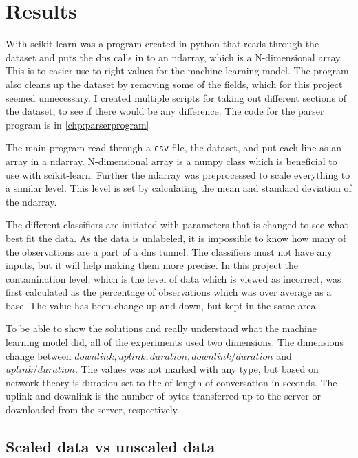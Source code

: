 \chapter{Results}
\label{chp:results}



With scikit-learn was a program created in python that reads through the dataset and puts the \gls{dns} calls in to an ndarray, which is a N-dimensional array. This is to easier use to right values for the machine learning model. The program also cleans up the dataset by removing some of the fields, which for this project seemed unnecessary. I created multiple scripts for taking out different sections of the dataset, to see if there would be any difference. The code for the parser program is in \ref{chp:parserprogram}

The main program read through a \texttt{csv} file, the dataset, and put each line as an array in a ndarray. N-dimensional array is a numpy class which is beneficial to use with scikit-learn. Further the ndarray was preprocessed to scale everything to a similar level. This level is set by calculating the mean and standard deviation of the ndarray. 

The different classifiers are initiated with parameters that is changed to see what best fit the data. As the data is unlabeled, it is impossible to know how many of the observations are a part of a \gls{dns} tunnel. The classifiers must not have any inputs, but it will help making them more precise. In this project the contamination level, which is the level of data which is viewed as incorrect, was first calculated as the percentage of observations which was over average as a base. The value has been change up and down, but kept in the same area. 

To be able to show the solutions and really understand what the machine learning model did, all of the experiments used two dimensions. The dimensions change between $downlink, uplink, duration, downlink/duration$ and $uplink/duration$. The values was not marked with any type, but based on network theory is duration set to the of length of conversation in seconds. The uplink and downlink is  the number of bytes transferred up to the server or downloaded from the server, respectively. 

\section{Scaled data vs unscaled data}


